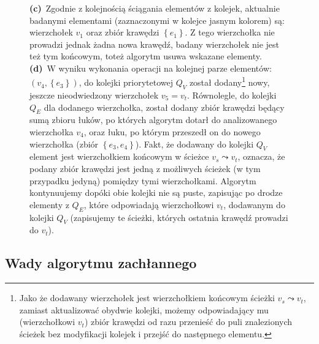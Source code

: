 \begin{savenotes}
\begin{figure}[!h]
{			\textbf{(c)}~Zgodnie z kolejnością ściągania elementów z kolejek, aktualnie badanymi elementami (zaznaczonymi w kolejce jasnym kolorem) są: wierzchołek $v_{1}$ oraz zbiór krawędzi $\left\{ e_{1} \right\}$. Z tego wierzchołka nie prowadzi jednak żadna nowa krawędź, badany wierzchołek nie jest też tym końcowym, toteż algorytm usuwa wskazane elementy.
			\textbf{(d)}~W wyniku wykonania operacji na kolejnej parze elementów: $\left( v_{4}, \left\{ e_{3} \right\} \right)$, do kolejki priorytetowej $Q_{V}$ został dodany\footnote{Jako że dodawany wierzchołek jest wierzchołkiem końcowym ścieżki $v_{s} \leadsto v_{t}$, zamiast aktualizować obydwie kolejki, możemy odpowiadający mu (wierzchołkowi $v_{t}$) zbiór krawędzi od razu przenieść do puli znalezionych ścieżek bez modyfikacji kolejek i przejść do następnego elementu.} nowy, jeszcze nieodwiedzony wierzchołek $v_{5} = v_{t}$. Równolegle, do kolejki $Q_{E}$ dla dodanego wierzchołka, został dodany zbiór krawędzi będący sumą zbioru łuków, po których algorytm dotarł do analizowanego wierzchołka $v_{4}$, oraz łuku, po którym przeszedł on do nowego wierzchołka (zbiór $\left\{ e_{3}, e_{4} \right\}$). Fakt, że dodawany do kolejki $Q_{V}$ element jest wierzchołkiem końcowym w ścieżce $v_{s} \leadsto v_{t}$, oznacza, że podany zbiór krawędzi jest jedną z możliwych ścieżek (w tym przypadku jedyną) pomiędzy tymi wierzchołkami. Algorytm kontynuujemy dopóki obie kolejki nie są puste, zapisując po drodze elementy z $Q_{E}$, które odpowiadają wierzchołkowi $v_{t}$, dodawanym do kolejki $Q_{V}$ (zapisujemy te ścieżki, których ostatnia krawędź prowadzi do $v_{t}$).
		}
		\label{fig:bfsExample}
	\end{figure}
\end{savenotes}

\subsection{Wady algorytmu zachłannego}

